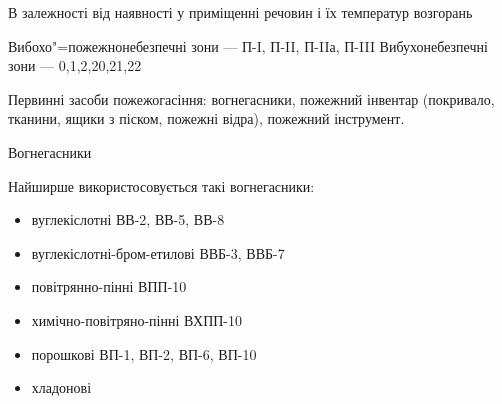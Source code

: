 \documentclass[a5paper,10pt,notitlepage,pdftex,headsepline]{scrartcl}
\begin{document}
  В залежності від наявності у приміщенні речовин і їх температур возгорань

  Вибохо"=пожежнонебезпечні зони --- П-I, П-II, П-IIа, П-III
          Вибухонебезпечні зони --- 0,1,2,20,21,22

  Первинні засоби пожежогасіння: вогнегасники, пожежний інвентар (покривало,
  тканини, ящики з піском, пожежні відра), пожежний інструмент.

  Вогнегасники

  Найширше використосовується такі вогнегасники:
  \begin{itemize}
    \item вуглекіслотні ВВ-2, ВВ-5, ВВ-8
    \item вуглекіслотні-бром-етилові ВВБ-3, ВВБ-7
    \item повітрянно-пінні ВПП-10
    \item химічно-повітряно-пінні ВХПП-10
    \item порошкові ВП-1, ВП-2, ВП-6, ВП-10
    \item хладонові
  \end{itemize}
\end{document}
